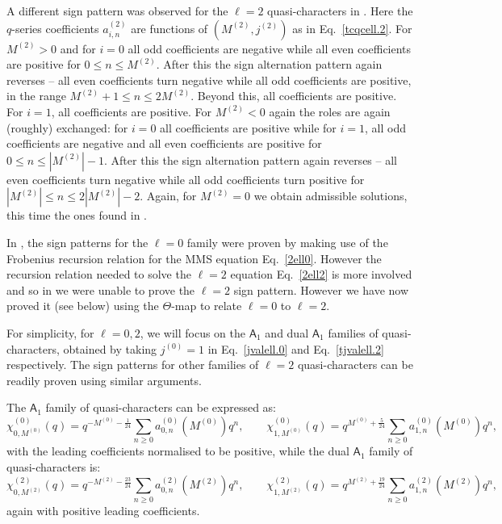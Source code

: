 \documentclass[11pt]{article}
\newcommand\mA{{\mathsf A}}
\begin{document}
A different sign pattern was observed for the $\ell=2$ quasi-characters in \cite{Chandra:2018pjq}. Here the $q$-series coefficients $a_{i,n}^{(2)}$ are functions of $(M^{(2)},j^{(2)})$ as in Eq.~\eqref{tcqcell.2}. For $M^{(2)}>0$ and for $i=0$ all odd coefficients are negative while all even coefficients are positive for $0\leq n\leq M^{(2)}$. After this the sign alternation pattern again reverses -- all even coefficients turn negative while all odd coefficients are positive, in the range $M^{(2)}+1\leq n\leq 2M^{(2)}$. Beyond this, all coefficients are positive. For $i=1$, all coefficients are positive. For $M^{(2)}<0$ again the roles are again (roughly) exchanged: for $i=0$ all coefficients are positive while for $i=1$, all odd coefficients are negative and all even coefficients are positive for $0\leq n\leq |M^{(2)}|-1$. After this the sign alternation pattern again reverses -- all even coefficients turn negative while all odd coefficients turn positive for $|M^{(2)}|\leq n\leq 2|M^{(2)}|-2$. Again, for $M^{(2)}=0$ we obtain admissible solutions, this time the ones found in \cite{Naculich:1988xv, Hampapura:2015cea, Gaberdiel:2016zke}.

In \cite{Das:2025gto}, the sign patterns for the $\ell=0$ family were proven by making use of the Frobenius recursion relation for the MMS equation Eq.~\eqref{2ell0}. However the recursion relation needed to solve the $\ell=2$ equation Eq.~\eqref{2ell2} is more involved and so in \cite{Das:2025gto} we were unable to prove the $\ell=2$ sign pattern. However we have now proved it (see below) using the $\Theta$-map to relate $\ell=0$ to $\ell=2$.

For simplicity, for $\ell=0,2$, we will focus on the $\mA_1$ and dual $\mA_1$ families of quasi-characters, obtained by taking $j^{(0)}=1$ in Eq.~\eqref{jvalell.0} and Eq.~\eqref{tjvalell.2} respectively. The sign patterns for other families of $\ell=2$ quasi-characters can be readily proven using similar arguments.

The \(\mA_1\) family of quasi-characters can be expressed as:
\begin{equation}
\chi^{(0)}_{0,M^{(0)}}(q)
=
q^{-M^{(0)}-\frac{1}{24}}
\sum_{n\ge0}a^{(0)}_{0,n}(M^{(0)})q^n,
\qquad
\chi^{(0)}_{1,M^{(0)}}(q)
=
q^{M^{(0)}+\frac{5}{24}}
\sum_{n\ge0}a^{(0)}_{1,n}(M^{(0)})q^n,
\label{eq:l0-A1-def}
\end{equation}
with the leading coefficients normalised to be positive, while the dual \(\mA_1\) family of quasi-characters is:
\begin{equation}
\chi^{(2)}_{0,M^{(2)}}(q)
=
q^{-M^{(2)}-\frac{23}{24}}
\sum_{n\ge0}a^{(2)}_{0,n}(M^{(2)})q^n,
\qquad
\chi^{(2)}_{1,M^{(2)}}(q)
=
q^{M^{(2)}+\frac{19}{24}}
\sum_{n\ge0}a^{(2)}_{1,n}(M^{(2)})q^n,
\label{eq:l2-A1-def}
\end{equation}
again with positive leading coefficients.
\end{document}
